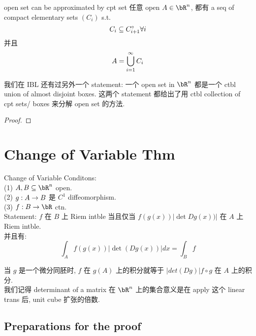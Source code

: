 \documentclass[lang=cn,11pt]{elegantbook}
\begin{document}
\begin{lemma}{open set can be approximated by cpt set}
    任意 open $A \in \bR^n$, 都有 a seq of compact elementary sets $(C_i)$ s.t. 
    $$
    C_i \subseteq C_{i+1}^{\circ} \forall i
    $$
    并且
    $$
    A = \displaystyle\bigcup_{i=1}^\infty C_i
    $$
\end{lemma}

\begin{remark}
    我们在 IBL 还有过另外一个 statement: 一个 open set in $\bR^n$ 都是一个 ctbl union of almost disjoint boxes. 这两个 statement 都给出了用 ctbl collection of cpt sets/ boxes 来分解 open set 的方法.
\end{remark}

\begin{proof}
    
\end{proof}






\chapter{Change of Variable Thm}
\begin{theorem}{Change of Variable}
Conditons:\\
(1) $A,B \sub \bR^n$ open.\\
(2) $g:A \rightarrow B$ 是 $C^1$ diffeomorphism.\\
(3) $f:B \rar \bR$ ctn.\\

Statement:
$f$ 在 $B$ 上 Riem intble 当且仅当 $f(g(x))  |\det Dg(x)) |$ 在 $A$ 上 Riem intble.\\
并且有:
$$
\int_A f(g(x)) |\det (Dg(x))| dx = \int_B f
$$
    
\end{theorem}
\begin{remark}
    当 $g$ 是一个微分同胚时, $f$ 在 $g(A)$ 上的积分就等于 $|det(Dg)| f\circ g $ 在 $A$ 上的积分.\\
    我们记得 determinant of a matrix 在 $\bR^n$ 上的集合意义是在 apply 这个 linear trans 后, unit cube 扩张的倍数.\\
\end{remark}





\section{Preparations for the proof}
\end{document}
